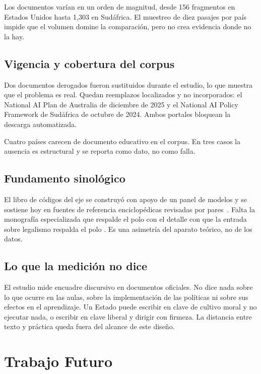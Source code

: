 Los documentos varían en un orden de magnitud, desde 156 fragmentos en Estados Unidos hasta 1{,}303 en Sudáfrica. El muestreo de diez pasajes por país impide que el volumen domine la comparación, pero no crea evidencia donde no la hay.

\subsection{Vigencia y cobertura del corpus}

Dos documentos derogados fueron sustituidos durante el estudio, lo que muestra que el problema es real. Quedan reemplazos localizados y no incorporados: el National AI Plan de Australia de diciembre de 2025 y el National AI Policy Framework de Sudáfrica de octubre de 2024. Ambos portales bloquean la descarga automatizada.

Cuatro países carecen de documento educativo en el corpus. En tres casos la ausencia es estructural y se reporta como dato, no como falla.

\subsection{Fundamento sinológico}

El libro de códigos del eje se construyó con apoyo de un panel de modelos y se sostiene hoy en fuentes de referencia enciclopédicas revisadas por pares~\citep{pines2023legalism, vannorden2024mencius, goldin2025xunzi}. Falta la monografía especializada que respalde el polo \dezhi con el detalle con que la entrada sobre legalismo respalda el polo \fa. Es una asimetría del aparato teórico, no de los datos.

\subsection{Lo que la medición no dice}

El estudio mide encuadre discursivo en documentos oficiales. No dice nada sobre lo que ocurre en las aulas, sobre la implementación de las políticas ni sobre sus efectos en el aprendizaje. Un Estado puede escribir en clave de cultivo moral y no ejecutar nada, o escribir en clave liberal y dirigir con firmeza. La distancia entre texto y práctica queda fuera del alcance de este diseño.

\section{Trabajo Futuro}

